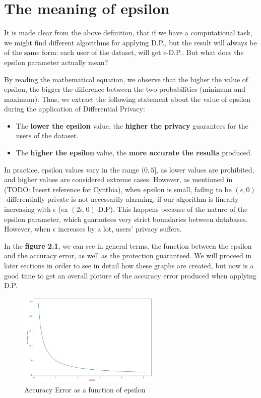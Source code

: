 \section{The meaning of epsilon}
It is made clear from the above definition, that if we have a computational task, we might find different algorithms for applying D.P., but the result will always be of the same form: each user of the dataset, will get $\epsilon$-D.P.. But what does the epsilon parameter actually mean?

By reading the mathematical equation, we observe that the higher the value of epsilon, the bigger the difference between the two probabilities (minimum and maximum). Thus, we extract the following statement about the value of epsilon during the application of Differential Privacy:

\begin{itemize}
    \item The \textbf{lower the epsilon} value, the \textbf{higher the privacy} guarantees for the users of the dataset.
    \item The \textbf{higher the epsilon} value, the \textbf{more accurate the results} produced.
\end{itemize}

In practice, epsilon values vary in the range $(0,5]$, as lower values are prohibited, and higher values are considered extreme cases. However, as mentioned in (TODO: Insert reference for Cynthia),  when epsilon is small, failing to be $(\epsilon, 0)$-differentially private is not necessarily alarming, if our algorithm is linearly increasing with $\epsilon$ (ex $(2\epsilon, 0)$-D.P). This happens because of the nature of the epsilon parameter, which guarantees very strict boundaries between databases. However, when $\epsilon$ increases by a lot, users' privacy suffers. 

In the \textbf{figure 2.1}, we can see in general terms, the function between the epsilon and the accuracy error, as well as the protection guaranteed. We will proceed in later sections in order to see in detail how these graphs are created, but now is a good time to get an overall picture of the accuracy error produced when applying D.P.
\bigskip
\bigskip\bigskip

\begin{figure}[!htb]\centering
      \includegraphics[width=0.6\textwidth]{images/epsilon_intro_graph.png}
  \caption{Accuracy Error as a function of epsilon}
\end{figure}

